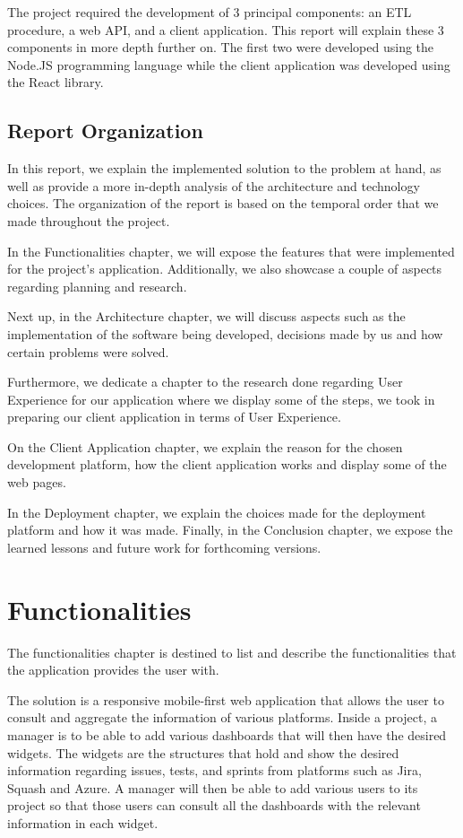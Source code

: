 \documentclass[a4paper,twoside,10pt]{report}
\begin{document}
The project required the development of 3 principal components: an ETL procedure, a web API, and a client application. This report will explain these 3 components in more depth further on.
The first two were developed using the Node.JS programming language while the client application was developed using the React library.

\section{Report Organization}
In this report, we explain the implemented solution to the problem at hand, as well as provide a more in-depth analysis of the architecture and technology choices. The organization of the report is based on the temporal order that we made throughout the project.

In the Functionalities chapter, we will expose the features that were implemented for the project's application. Additionally, we also showcase a couple of aspects regarding planning and research.

Next up, in the Architecture chapter, we will discuss aspects such as the implementation of the software being developed, decisions made by us and how certain problems were solved.

Furthermore, we dedicate a chapter to the research done regarding User Experience for our application where we display some of the steps, we took in preparing our client application in terms of User Experience.

On the Client Application chapter, we explain the reason for the chosen development platform, how the client application works and display some of the web pages.  

In the Deployment chapter, we explain the choices made for the deployment platform and how it was made. Finally, in the Conclusion chapter, we expose the learned lessons and future work for forthcoming versions.

\chapter{Functionalities}

The functionalities chapter is destined to list and describe the functionalities that the application provides the user with.

The solution is a responsive mobile-first web application that allows the user to consult and aggregate the information of various platforms. Inside a project, a manager is to be able to add various dashboards that will then have the desired widgets. The widgets are the structures that hold and show the desired information regarding issues, tests, and sprints from platforms such as Jira\cite{JIRA}, Squash\cite{SQUASH} and Azure\cite{AZURE}. A manager will then be able to add various users to its project so that those users can consult all the dashboards with the relevant information in each widget.
\end{document}
